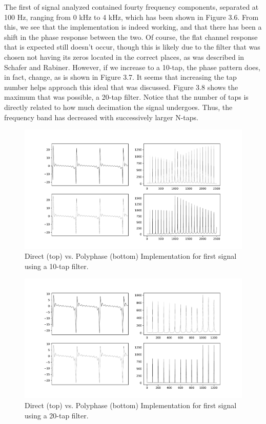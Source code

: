 \documentclass{report}
\begin{document}
The first of signal analyzed contained fourty frequency components, separated at 100 Hz, ranging from 0 kHz to 4 kHz, which has been shown in Figure 3.6.  From this, we see that the implementation is indeed working, and that there has been a shift in the phase response between the two.  Of course, the flat channel response that is expected still doesn't occur, though this is likely due to the filter that was chosen not having its zeros located in the correct places, as was described in Schafer and Rabiner.  However, if we increase to a 10-tap, the phase pattern does, in fact, change, as is shown in Figure 3.7.  It seems that increasing the tap number helps approach this ideal that was discussed.  Figure 3.8 shows the maximum that was possible, a 20-tap filter.  Notice that the number of taps is directly related to how much decimation the signal undergoes.  Thus, the frequency band has decreased with successively larger N-taps.  

\begin{figure}[!ht]
\includegraphics[scale=.45]{Figure_7.pdf}
\caption{Direct (top) vs. Polyphase (bottom) Implementation for first signal using a 10-tap filter.}
\end{figure} 

\begin{figure}[!ht]
\includegraphics[scale=.45]{Figure_8.pdf}
\caption{Direct (top) vs. Polyphase (bottom) Implementation for first signal using a 20-tap filter.}
\end{figure} 
\end{document}
